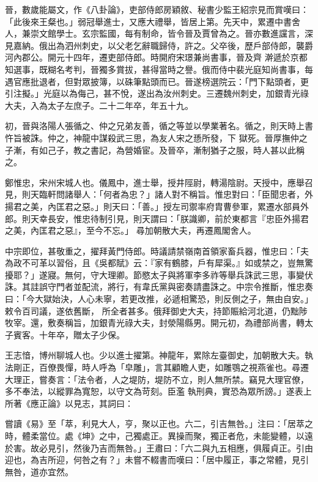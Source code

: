 \begin{pinyinscope}
 晉，數歲能屬文，作《八卦論》，吏部侍郎房穎敘、秘書少監王紹宗見而賞嘆曰：「此後來王粲也。」弱冠舉進士，又應大禮舉，皆居上第。先天中，累遷中書舍人，兼崇文館學士。玄宗監國，每有制命，皆令晉及賈曾為之。晉亦數進讜言，深見嘉納。俄出為泗州刺史，以父老乞辭職歸侍，許之。父卒後，歷戶部侍郎，襲爵河內郡公。開元十四年，遷吏部侍郎。時開府宋璟兼尚書事，晉及齊
 澣遞於京都知選事，既糊名考判，晉獨多賞拔，甚得當時之譽。俄而侍中裴光庭知尚書事，每遇官應批退者，但對眾披簿，以硃筆點頭而已。晉遂榜選院云：「門下點頭者，更引注擬。」光庭以為侮己，甚不悅，遂出為汝州刺史。三遷魏州刺史，加銀青光祿大夫，入為太子左庶子。二十二年卒，年五十九。



 初，晉與洛陽人張循之、仲之兄弟友善，循之等並以學業著名。循之，則天時上書忤旨被誅。仲之，神龍中謀殺武三思，為友人宋之愻所發，下
 獄死。晉厚撫仲之子漸，有如己子，教之書記，為營婚宦。及晉卒，漸制猶子之服，時人甚以此稱之。



 鄭惟忠，宋州宋城人也。儀鳳中，進士舉，授井陘尉，轉湯陰尉。天授中，應舉召見，則天臨軒問諸舉人：「何者為忠？」諸人對不稱旨。惟忠對曰：「臣聞忠者，外揚君之美，內匡君之惡。」則天曰：「善。」授左司禦率府胄曹參軍，累遷水部員外郎。則天幸長安，惟忠待制引見，則天謂曰：「朕識卿，前於東都言『忠臣外揚君之美，內匡君之惡』，至今不忘。」
 尋加朝散大夫，再遷鳳閣舍人。



 中宗即位，甚敬重之，擢拜黃門侍郎。時議請禁嶺南首領家畜兵器，惟忠曰：「夫為政不可革以習俗，且《吳都賦》云：『家有鶴膝，戶有犀渠。』如或禁之，豈無驚擾耶？」遂寢。無何，守大理卿。節愍太子與將軍李多祚等舉兵誅武三思，事變伏誅。其詿誤守門者並配流，將行，有韋氏黨與密奏請盡誅之。中宗令推斷，惟忠奏曰：「今大獄始決，人心未寧，若更改推，必遞相驚恐，則反側之子，無由自安。」敕令百司議，遂依舊斷，
 所全者甚多。俄拜御史大夫，持節賑給河北道，仍黜陟牧宰。還，敷奏稱旨，加銀青光祿大夫，封滎陽縣男。開元初，為禮部尚書，轉太子賓客。十年卒，贈太子少保。



 王志愔，博州聊城人也。少以進士擢第。神龍年，累除左臺御史，加朝散大夫。執法剛正，百僚畏憚，時人呼為「皁雕」，言其顧瞻人吏，如雕鶚之視燕雀也。尋遷大理正，嘗奏言：「法令者，人之堤防，堤防不立，則人無所禁。竊見大理官僚，多不奉法，以縱罪為寬恕，以守文為苛刻。臣濫
 執刑典，實恐為眾所謗。」遂表上所著《應正論》以見志，其詞曰：



 嘗讀《易》至「萃，利見大人，亨，聚以正也。六二，引吉無咎。」注曰：「居萃之時，體柔當位。處《坤》之中，己獨處正。異操而聚，獨正者危，未能變體，以遠於害。故必見引，然後乃吉而無咎。」王肅曰：「六二與九五相應，俱履貞正。引由迎也，為吉所迎，何咎之有？」未嘗不輟書而嘆曰：「居中履正，事之常體，見引無咎，道亦宜然。




\end{pinyinscope}

